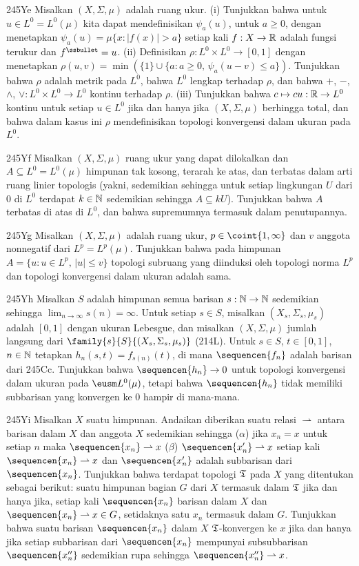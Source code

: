 {\spheader 245Ye Misalkan $(X,\Sigma,\mu)$ adalah ruang ukur. (i) Tunjukkan
bahwa untuk $u\in L^0=L^0(\mu)$ kita dapat mendefinisikan $\psi_a(u)$, untuk
$a\ge 0$, dengan menetapkan $\psi_a(u)=\mu\{x:|f(x)|>a\}$ setiap kali
$f:X\to\Bbb R$ adalah fungsi terukur dan $f^{\ssbullet}=u$. (ii) Definisikan
$\rho:L^0\times
L^0\to[0,1]$ dengan menetapkan
$\rho(u,v)=\min(\{1\}\cup\{a:a\ge 0,\,\psi_a(u-v)\le a\})$. Tunjukkan bahwa
$\rho$ adalah metrik pada $L^0$, bahwa $L^0$ lengkap terhadap $\rho$, dan
bahwa $+$, $-$, $\wedge$, $\vee:L^0\times L^0\to L^0$ kontinu terhadap $\rho$.
(iii) Tunjukkan bahwa $c\mapsto cu:\Bbb R\to L^0$ kontinu untuk setiap $u\in
L^0$ jika dan hanya jika $(X,\Sigma,\mu)$ berhingga total, dan bahwa dalam
kasus ini $\rho$ mendefinisikan topologi konvergensi dalam ukuran pada
$L^0$.

\spheader 245Yf Misalkan $(X,\Sigma,\mu)$ ruang ukur yang dapat dilokalkan dan
$A\subseteq L^0=L^0(\mu)$ himpunan tak kosong, terarah ke atas, dan terbatas
dalam arti ruang linier topologis (yakni,
sedemikian sehingga untuk setiap lingkungan $U$ dari $0$ di $L^0$ terdapat
$k\in\Bbb N$ sedemikian sehingga $A\subseteq kU$). Tunjukkan bahwa $A$
terbatas di atas di $L^0$, dan bahwa supremumnya termasuk dalam penutupannya.

\spheader 245Yg Misalkan $(X,\Sigma,\mu)$ adalah ruang ukur,
$p\in\coint{1,\infty}$ dan $v$ anggota nonnegatif dari $L^p=L^p(\mu)$.
Tunjukkan bahwa pada himpunan $A=\{u:u\in L^p,\,|u|\le v\}$ topologi subruang
yang diinduksi oleh topologi norma $L^p$ dan topologi konvergensi dalam
ukuran adalah sama.

\spheader 245Yh Misalkan $S$ adalah himpunan semua barisan $s:\Bbb
N\to\Bbb N$ sedemikian sehingga $\lim_{n\to\infty}s(n)=\infty$. Untuk setiap
$s\in S$, misalkan $(X_s,\Sigma_s,\mu_s)$ adalah $[0,1]$ dengan ukuran
Lebesgue, dan misalkan $(X,\Sigma,\mu)$ jumlah langsung dari
$\family{s}{S}{(X_s,\Sigma_s,\mu_s)}$ (214L). Untuk $s\in S$, $t\in[0,1]$,
$n\in\Bbb N$ tetapkan $h_n(s,t)=f_{s(n)}(t)$, di mana $\sequencen{f_n}$ adalah
barisan dari 245Cc. Tunjukkan bahwa $\sequencen{h_n}\to 0$ untuk topologi
konvergensi dalam ukuran pada $\eusm L^0(\mu)$, tetapi bahwa $\sequencen{h_n}$
tidak memiliki subbarisan yang konvergen ke $0$ hampir di mana-mana.

\spheader 245Yi Misalkan $X$ suatu himpunan. Andaikan diberikan suatu
relasi $\rightharpoonup$ antara barisan dalam $X$ dan anggota
$X$ sedemikian sehingga ($\alpha$) jika $x_n=x$ untuk setiap $n$ maka
$\sequencen{x_n}\rightharpoonup
x$ ($\beta$) $\sequencen{x'_n}\rightharpoonup
x$ setiap kali $\sequencen{x_n}\rightharpoonup x$ dan $\sequencen{x'_n}$ adalah
subbarisan dari $\sequencen{x_n}$. Tunjukkan bahwa terdapat topologi
$\frak T$ pada $X$ yang ditentukan sebagai berikut: suatu himpunan
bagian $G$ dari $X$ termasuk dalam $\frak T$ jika dan hanya jika, setiap kali
$\sequencen{x_n}$ barisan dalam $X$ dan $\sequencen{x_n}\rightharpoonup
x\in G$, setidaknya satu $x_n$ termasuk dalam $G$. Tunjukkan bahwa suatu barisan
$\sequencen{x_n}$ dalam $X$ $\frak T$-konvergen ke $x$ jika dan hanya jika
setiap subbarisan dari $\sequencen{x_n}$ mempunyai subsubbarisan
$\sequencen{x''_n}$ sedemikian rupa sehingga $\sequencen{x''_n}\halfarrow x$.

}
